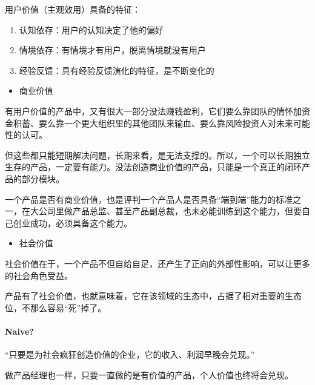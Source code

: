 \documentclass[letterpaper,11pt,english]{sphinxmanual}
\begin{document}
用户价值（主观效用）具备的特征：
%
\begin{footnote}[749]\sphinxAtStartFootnote
{}
%
\end{footnote}
\begin{enumerate}
%
\item {} 
认知依存：用户的认知决定了他的偏好

\item {} 
情境依存：有情境才有用户，脱离情境就没有用户

\item {} 
经验反馈：具有经验反馈演化的特征，是不断变化的

\end{enumerate}
\begin{itemize}
\item {} 
商业价值

\end{itemize}

有用户价值的产品中，又有很大一部分没法赚钱盈利，它们要么靠团队的情怀加资金积蓄、要么靠一个更大组织里的其他团队来输血、要么靠风险投资人对未来可能性的认可。

但这些都只能短期解决问题，长期来看，是无法支撑的。所以，一个可以长期独立生存的产品，一定要有能力。没法创造商业价值的产品，只能是一个真正的闭环产品的部分模块。

一个产品是否有商业价值，也是评判一个产品人是否具备“端到端”能力的标准之一，在大公司里做产品总监、甚至产品副总裁，也未必能训练到这个能力，但要自己创业成功，必须具备这个能力。
\begin{itemize}
\item {} 
社会价值

\end{itemize}

社会价值在于，一个产品不但自给自足，还产生了正向的外部性影响，可以让更多的社会角色受益。

产品有了社会价值，也就意味着，它在该领域的生态中，占据了相对重要的生态位，不那么容易“死”掉了。


\paragraph{Naive?}
\label{\detokenize{chapter_project/valuable:naive}}
“只要是为社会疯狂创造价值的企业，它的收入、利润早晚会兑现。”

做产品经理也一样，只要一直做的是有价值的产品，个人价值也终将会兑现。
\end{document}
